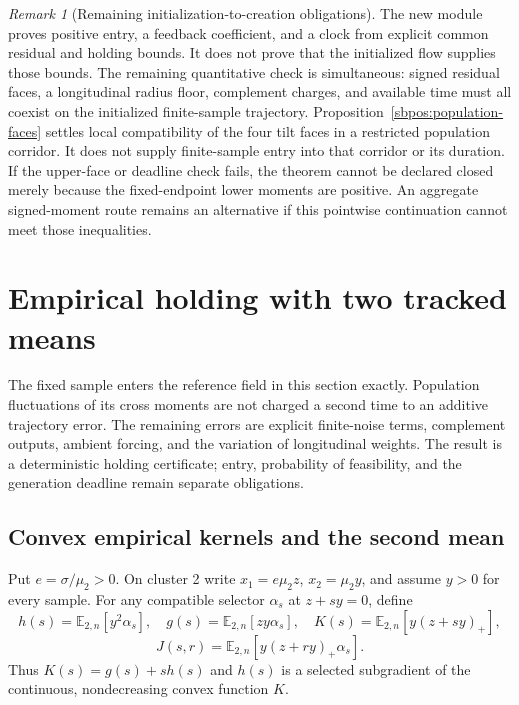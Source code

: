 \documentclass{article} %
\theoremstyle{plain}
\theoremstyle{definition}
\theoremstyle{remark}
\newtheorem{remark}[theorem]{Remark}
\begin{document}
\begin{remark}[Remaining initialization-to-creation obligations]
The new module proves positive entry, a feedback coefficient, and a clock
from explicit common residual and holding bounds. It does not prove that
the initialized flow supplies those bounds.
The remaining quantitative check is simultaneous: signed residual faces,
a longitudinal radius floor, complement charges, and available time must
all coexist on the initialized finite-sample trajectory.
Proposition~\ref{sbpos:population-faces} settles local compatibility of
the four tilt faces in a restricted population corridor. It does not
supply finite-sample entry into that corridor or its duration.
If the upper-face or deadline check fails, the theorem cannot be declared
closed merely because the fixed-endpoint lower moments are positive.
An aggregate signed-moment route remains an alternative if this pointwise
continuation cannot meet those inequalities.
\end{remark}

\section{Empirical holding with two tracked means}
\label{sbemp:scope}

The fixed sample enters the reference field in this section exactly.
Population fluctuations of its cross moments are not charged a second
 time to an additive trajectory error. The remaining errors are explicit
finite-noise terms, complement outputs, ambient forcing, and the variation
of longitudinal weights. The result is a deterministic holding certificate;
entry, probability of feasibility, and the generation deadline remain
separate obligations.

\subsection{Convex empirical kernels and the second mean}

Put $e=\sigma/\mu_2>0$. On cluster 2 write
$x_1=e\mu_2 z$, $x_2=\mu_2 y$, and assume $y>0$ for every sample.
For any compatible selector $\alpha_s$ at $z+sy=0$, define
\[
 h(s)=\mathbb E_{2,n}[y^2\alpha_s],\quad
 g(s)=\mathbb E_{2,n}[zy\alpha_s],\quad
 K(s)=\mathbb E_{2,n}[y(z+sy)_+],
\]
\[
 J(s,r)=\mathbb E_{2,n}[y(z+ry)_+\alpha_s].
\]
Thus $K(s)=g(s)+s h(s)$ and $h(s)$ is a selected subgradient of the
continuous, nondecreasing convex function $K$.
\end{document}
